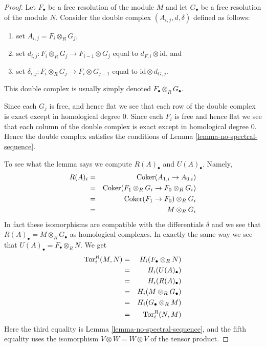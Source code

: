 \begin{proof}
Let $F_\bullet$ be a free resolution of the module $M$ and
let $G_\bullet$ be a free resolution of the module $N$.
Consider the double complex $(A_{i, j}, d, \delta)$ defined
as follows:
\begin{enumerate}
\item set $A_{i, j} = F_i \otimes_R G_j$,
\item set $d_{i, j} : F_i \otimes_R G_j \to F_{i-1} \otimes G_j$
equal to $d_{F, i} \otimes \text{id}$, and
\item set $\delta_{i, j} : F_i \otimes_R G_j \to F_i \otimes G_{j-1}$
equal to $\text{id} \otimes d_{G, j}$.
\end{enumerate}
This double complex is usually simply denoted $F_\bullet \otimes_R G_\bullet$.

\medskip\noindent
Since each $G_j$ is free, and hence flat we see that each
row of the double complex is exact except in homological
degree $0$. Since each $F_i$ is free and hence flat we see that each
column of the double complex is exact except in homological
degree $0$. Hence the double complex satisfies the conditions
of Lemma \ref{lemma-no-spectral-sequence}.

\medskip\noindent
To see what the lemma says we compute $R(A)_\bullet$ and $U(A)_\bullet$.
Namely,
\begin{eqnarray*}
R(A)_i & = & \text{Coker}(A_{1, i} \to A_{0, i}) \cr
& = & \text{Coker}(F_1 \otimes_R G_i \to F_0 \otimes_R G_i) \cr
& = & \text{Coker}(F_1 \to F_0) \otimes_R G_i \cr
& = & M \otimes_R G_i
\end{eqnarray*}
In fact these isomorphisms are compatible with the differentials
$\delta$ and we see that $R(A)_\bullet = M \otimes_R G_\bullet$
as homological complexes. In exactly the same way we see that
$U(A)_\bullet = F_\bullet \otimes_R N$. We get
\begin{eqnarray*}
\text{Tor}_i^R(M, N)
& = & H_i(F_\bullet \otimes_R N) \cr
& = & H_i(U(A)_\bullet) \cr
& = & H_i(R(A)_\bullet) \cr
& = & H_i(M \otimes_R G_\bullet) \cr
& = & H_i(G_\bullet\otimes_R M) \cr
& = & \text{Tor}_i^R(N, M)
\end{eqnarray*}
Here the third equality is Lemma \ref{lemma-no-spectral-sequence}, and
the fifth equality uses the isomorphism $V\otimes W = W \otimes V$
of the tensor product.


\end{proof}
